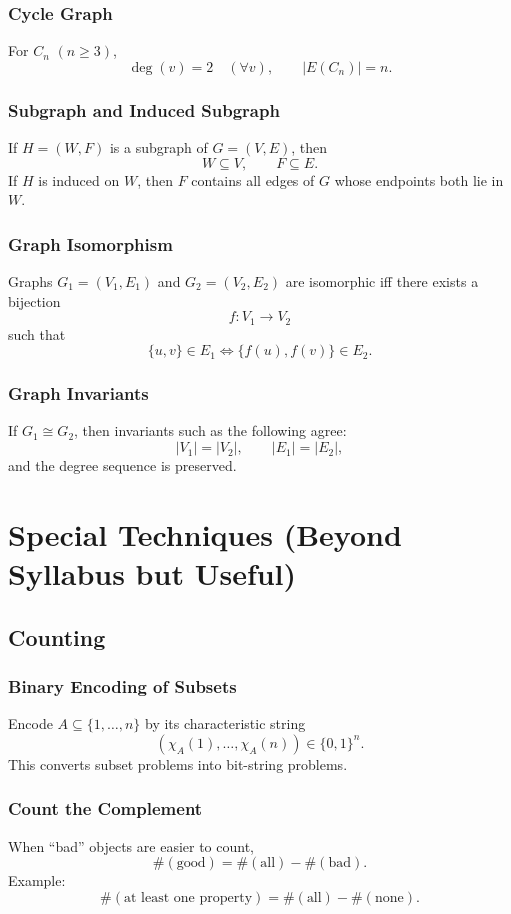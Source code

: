 \documentclass[12pt]{article}
\begin{document}
\subsubsection{Cycle Graph}
For \(C_n\) \((n\ge 3)\),
\[
\deg(v)=2 \quad (\forall v),
\qquad
|E(C_n)|=n.
\]

\subsubsection{Subgraph and Induced Subgraph}
If \(H=(W,F)\) is a subgraph of \(G=(V,E)\), then
\[
W\subseteq V,\qquad F\subseteq E.
\]
If \(H\) is induced on \(W\), then \(F\) contains all edges of \(G\) whose endpoints both lie in \(W\).

\subsubsection{Graph Isomorphism}
Graphs \(G_1=(V_1,E_1)\) and \(G_2=(V_2,E_2)\) are isomorphic iff there exists a bijection
\[
f:V_1\to V_2
\]
such that
\[
\{u,v\}\in E_1 \iff \{f(u),f(v)\}\in E_2.
\]

\subsubsection{Graph Invariants}
If \(G_1\cong G_2\), then invariants such as the following agree:
\[
|V_1|=|V_2|,
\qquad
|E_1|=|E_2|,
\]
and the degree sequence is preserved.

\section{Special Techniques (Beyond Syllabus but Useful)}

\subsection{Counting}

\subsubsection{Binary Encoding of Subsets}
Encode \(A\subseteq\{1,\dots,n\}\) by its characteristic string
\[
(\chi_A(1),\dots,\chi_A(n))\in\{0,1\}^n.
\]
This converts subset problems into bit-string problems.

\subsubsection{Count the Complement}
When “bad” objects are easier to count,
\[
\#(\text{good})=\#(\text{all})-\#(\text{bad}).
\]
Example:
\[
\#(\text{at least one property})
=
\#(\text{all})-\#(\text{none}).
\]
\end{document}
